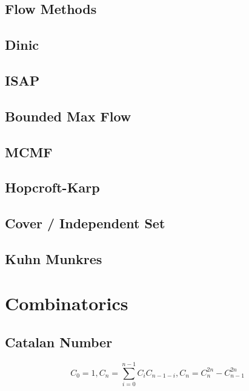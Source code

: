 \documentclass[a4paper,10pt,twocolumn,oneside]{article}
\begin{document}
\subsection{Flow Methods}


\subsection{Dinic}


\subsection{ISAP}


\subsection{Bounded Max Flow}


\subsection{MCMF}


\subsection{Hopcroft-Karp}


\subsection{Cover / Independent Set}


\subsection{Kuhn Munkres}


\section{Combinatorics}

\subsection{Catalan Number}
$$
C_0=1, C_n=\sum_{i=0}^{n-1} C_i C_{n-1-i}, C_n=C_n^{2n}-C_{n-1}^{2n}
$$
\end{document}
